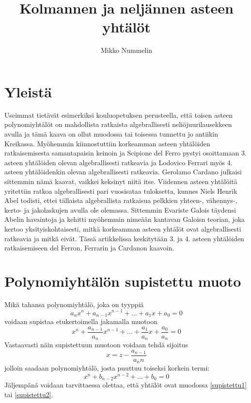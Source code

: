 \documentclass[a4paper]{article}
\begin{document}
\title{Kolmannen ja neljännen asteen yhtälöt}
\author{Mikko Nummelin}
\maketitle
\tableofcontents
\section{Yleistä}
Useimmat tietävät esimerkiksi kouluopetuksen perusteella, että toisen asteen polynomiyhtälöt on mahdollista ratkaista algebrallisesti neliöjuurilausekkeen avulla ja tämä kaava on ollut muodossa tai toisessa tunnettu jo antiikin Kreikassa. Myöhemmin kiinnostuttiin korkeamman asteen yhtälöiden ratkaisemisesta samantapaisin keinoin ja Scipione del Ferro pystyi osoittamaan 3. asteen yhtälöiden olevan algebrallisesti ratkeavia ja Lodovico Ferrari myös 4. asteen yhtälöidenkin olevan algebrallisesti ratkeavia. Gerolamo Cardano julkaisi sittemmin nämä kaavat, vaikkei keksinyt niitä itse. Viidennen asteen yhtälöitä yritettiin ratkoa algebrallisesti pari vuosisataa tuloksetta, kunnes Niels Henrik Abel todisti, ettei tällaista algebrallista ratkaisua pelkkien yhteen-, vähennys-, kerto- ja jakolaskujen avulla ole olemassa. Sittemmin Evariste Galois täydensi Abelin havaintoja ja kehitti myöhemmin nimeään kantavan Galoisn teorian, joka kertoo yksityiskohtaisesti, mitkä korkeamman asteen yhtälöt ovat algebrallisesti ratkeavia ja mitkä eivät. Tässä artikkelissa keskitytään 3. ja 4. asteen yhtälöiden ratkaisemiseen del Ferron, Ferrarin ja Cardanon kaavoin.
\section{Polynomiyhtälön supistettu muoto}
Mikä tahansa polynomiyhtälö, joka on tyyppiä
$$
a_n x^n+a_{n-1} x^{n-1}+\ldots+a_1 x+a_0 = 0
$$
voidaan supistaa etukertoimella jakamalla muotoon
\begin{equation}
  \label{supistettu1}
x^n+\frac{a_{n-1}}{a_n} x^{n-1}+\ldots+\frac{a_1}{a_n} x+\frac{a_0}{a_n} = 0
\end{equation}
Vastaavasti näin supistettuun muotoon voidaan tehdä sijoitus
$$
x=z-\frac{a_{n-1}}{a_n n}
$$
jolloin saadaan polynomiyhtälö, josta puuttuu toiseksi korkein termi:
\begin{equation}
  \label{supistettu2}
x^n+b_{n-2} x^{n-2}+\ldots+b_0 = 0
\end{equation}
Jäljempänä voidaan tarvittaessa olettaa, että yhtälöt ovat muodossa \ref{supistettu1} tai \ref{supistettu2}.
\end{document}

